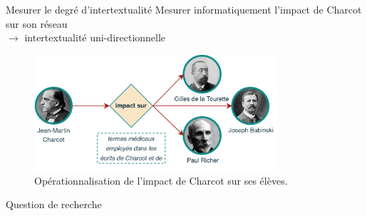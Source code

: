 
\begin{frame}{Mesurer le degré d'intertextualité}
Mesurer informatiquement l'impact de Charcot sur son réseau \\$\rightarrow$ intertextualité uni-directionnelle
\begin{figure}[!h]
    \centering
\includegraphics[width=90mm,scale=0.5]{pic/charcot_intertextualite.png}
    \caption{Opérationnalisation de l'impact de Charcot sur ses élèves.}
    \label{fig:my_label}
\end{figure}
\end{frame}

\begin{frame}{Question de recherche}

\begin{exampleblock}{}
\centering
\end{exampleblock}
\end{frame}

